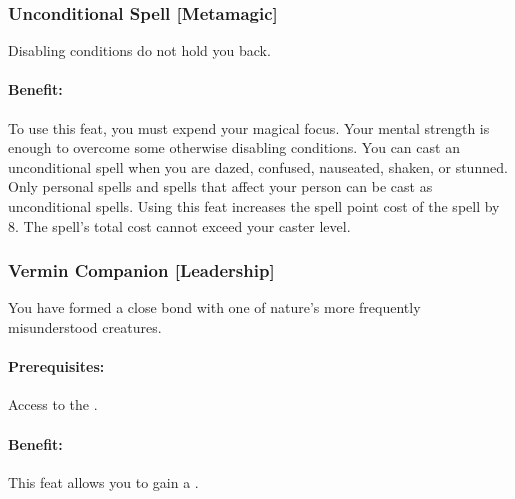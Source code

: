 \subsubsection[Unconditional Spell]{Unconditional Spell [Metamagic]}
\label{Feat:UnconditionalSpell}
Disabling conditions do not hold you back.

\paragraph{Benefit:} To use this feat, you must expend your magical focus. Your mental strength is enough to overcome some otherwise disabling conditions. You can cast an unconditional spell when you are dazed, confused, nauseated, shaken, or stunned.
Only personal spells and spells that affect your person can be cast as unconditional spells.
Using this feat increases the spell point cost of the spell by 8. The spell's total cost cannot exceed your caster level.

\subsubsection[Vermin Companion]{Vermin Companion [Leadership]}
\label{Feat:VerminCompanion}
You have formed a close bond with one of nature's more frequently misunderstood creatures.

\paragraph{Prerequisites:} Access to the .

\paragraph{Benefit:} This feat allows you to gain a .